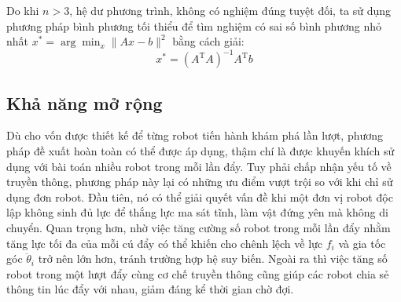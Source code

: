 Do khi $n > 3$, hệ dư phương trình, không có nghiệm đúng tuyệt đối, ta sử dụng phương pháp bình phương tối thiểu để tìm nghiệm có sai số bình phương nhỏ nhất $x^{*} = \arg\min_x \|A x - b\|^2$ bằng cách giải: 
\begin{equation}
    x^{*} = (A^{\mathrm{T}} A)^{-1} A^{\mathrm{T}} b
\end{equation}

\subsection{Khả năng mở rộng}
Dù cho vốn được thiết kế để từng robot tiến hành khám phá lần lượt, phương pháp đề xuất hoàn toàn có thể được áp dụng, thậm chí là được khuyến khích sử dụng với bài toán nhiều robot trong mỗi lần đẩy. Tuy phải chấp nhận yếu tố về truyền thông, phương pháp này lại có những ưu điểm vượt trội so với khi chỉ sử dụng đơn robot. Đầu tiên, nó có thể giải quyết vấn đề khi một đơn vị robot độc lập không sinh đủ lực để thắng lực ma sát tĩnh, làm vật đứng yên mà không di chuyển. Quan trọng hơn, nhờ việc tăng cường số robot trong mỗi lần đẩy nhằm tăng lực tối đa của mỗi cú đẩy có thể khiến cho chênh lệch về lực $f_i$ và gia tốc góc $\ddot{\theta}_i$ trở nên lớn hơn, tránh trường hợp hệ suy biến. Ngoài ra thì việc tăng số robot trong một lượt đẩy cùng cơ chế truyền thông cũng giúp các robot chia sẻ thông tin lúc đẩy với nhau, giảm đáng kể thời gian chờ đợi.




